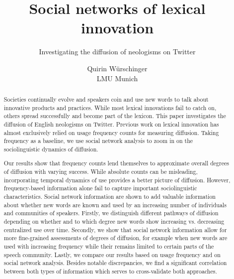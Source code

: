 \documentclass[a4paper, abstract=on]{scrartcl}
\begin{document}

  \title{Social networks of lexical innovation}
  \subtitle{Investigating the diffusion of neologisms on Twitter}
  \author{Quirin Würschinger\\ LMU Munich}
  \maketitle


\tableofcontents


  \cleardoublepage

  \begin{abstract}

    Societies continually evolve and speakers coin and use new words to talk about innovative products and practices. While most lexical innovations fail to catch on, others spread successfully and become part of the lexicon. This paper investigates the diffusion of English neologisms on Twitter. Previous work on lexical innovation has almost exclusively relied on usage frequency counts for measuring diffusion. Taking frequency as a baseline, we use social network analysis to zoom in on the sociolinguistic dynamics of diffusion.

    Our results show that frequency counts lend themselves to approximate overall degrees of diffusion with varying success. While absolute counts can be misleading, incorporating temporal dynamics of use provides a better picture of diffusion. However, frequency-based information alone fail to capture important sociolinguistic characteristics. Social network information are shown to add valuable information about whether new words are known and used by an increasing number of individuals and communities of speakers. Firstly, we distinguish different pathways of diffusion depending on whether and to which degree new words show increasing vs. decreasing centralized use over time. Secondly, we show that social network information allow for more fine-grained assessments of degrees of diffusion, for example when new words are used with increasing frequency while their remains limited to certain parts of the speech community. Lastly, we compare our results based on usage frequency and on social network analysis. Besides notable discrepancies, we find a significant correlation between both types of information which serves to cross-validate both approaches.


\end{abstract}
\end{document}

